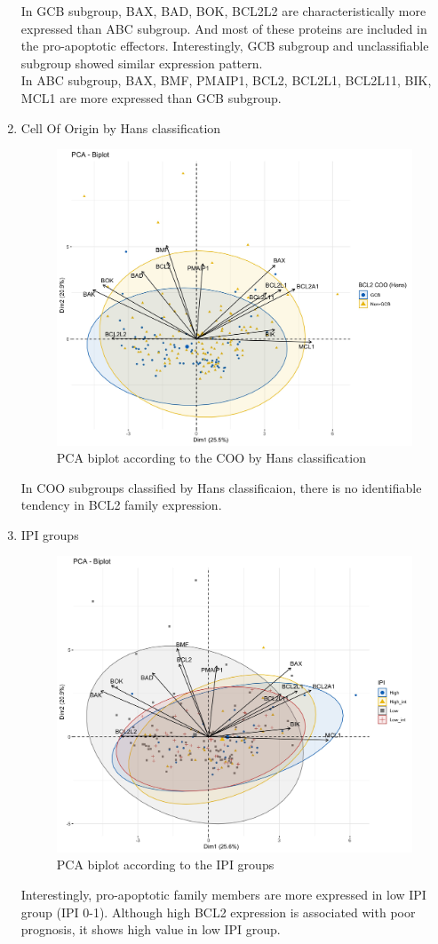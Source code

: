 \documentclass{article}
\begin{document}
\begin{enumerate}
    In GCB subgroup, BAX, BAD, BOK, BCL2L2 are characteristically more expressed than ABC subgroup. And most of these proteins are included in the pro-apoptotic effectors. Interestingly, GCB subgroup and unclassifiable subgroup showed similar expression pattern.\\
    In ABC subgroup, BAX, BMF, PMAIP1, BCL2, BCL2L1, BCL2L11, BIK, MCL1 are more expressed than GCB subgroup. 
    
    \item Cell Of Origin by Hans classification
    
    \begin{figure}[H]
        \includegraphics[width = 0.8\linewidth]{Image/COO_Hans_biplot.jpg}
        \caption{PCA biplot according to the COO by Hans classification}
    \end{figure}
    
    In COO subgroups classified by Hans classificaion, there is no identifiable tendency in BCL2 family expression.
    
    \item IPI groups
    
    \begin{figure}[H]
        \includegraphics[width = 0.8\linewidth]{Image/IPI_biplot.jpg}
        \caption{PCA biplot according to the IPI groups}
    \end{figure}
    
    Interestingly, pro-apoptotic family members are more expressed in low IPI group (IPI 0-1). Although high BCL2 expression is associated with poor prognosis, it shows high value in low IPI group.
    
\end{enumerate}
\end{document}
